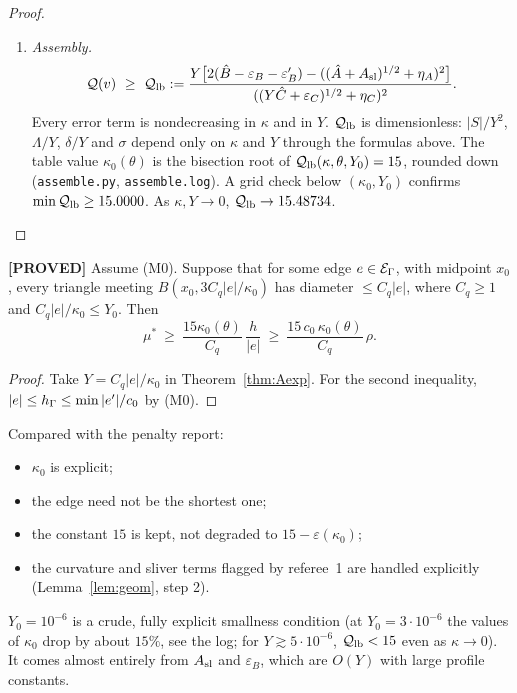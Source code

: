 \documentclass[11pt]{article}
\theoremstyle{remark}\newtheorem{remark}[theorem]{Remark}
\newcommand{\norm}[1]{\|#1\|}\newcommand{\ip}[2]{\langle #1,#2\rangle}\DeclareMathOperator{\curl}{curl}\DeclareMathOperator{\diam}{diam}
\newcommand{\lab}[1]{\textbf{[#1]}}
\begin{document}
\begin{proof}
\begin{enumerate}[label=\arabic*.]
Lemma~\ref{lem:arg}, $|D^2e_F|\le E_2m_6\kappa^4/Y$ and $|\nabla e_F|\le E_1m_6\kappa^5$ on $S$. With $A(z)^{1/2}\le\sqrt2\norm{\nabla z}$:
\[A(v)^{1/2}\le(\hat A+A_{\rm sl})^{1/2}+\eta_A,\quad \eta_A=2E_2m_6\kappa^4\sqrt{|S|}/Y;\qquad
C(v)^{1/2}\le(Y\hat C+\varepsilon_C)^{1/2}+\eta_C,\quad \eta_C=E_1m_6\kappa^5\sqrt\Lambda;\]
\[|B(v)-B_{\Gh}(w)|\le\varepsilon_B':=\frac{E_2m_6\kappa^4\sqrt\Lambda}{Y}\bigl((Y\hat C+\varepsilon_C)^{1/2}+\eta_C\bigr)+\frac{m_2\sqrt\Lambda}{Y}\eta_C,\]
using $B(v)-B(w)=\ip{\dn(v-w)}v+\ip{\dn w}{v-w}$.
\item \emph{Assembly.}
\[\mathcal Q(v)\ \ge\ \mathcal Q_{\rm lb}:=\frac{Y\bigl[2(\hat B-\varepsilon_B-\varepsilon_B')-((\hat A+A_{\rm sl})^{1/2}+\eta_A)^2\bigr]}{((Y\hat C+\varepsilon_C)^{1/2}+\eta_C)^2}.\]
Every error term is nondecreasing in $\kappa$ and in $Y$. $\mathcal Q_{\rm lb}$ is dimensionless: $|S|/Y^2$, $\Lambda/Y$,
$\delta/Y$ and $\sigma$ depend only on $\kappa$ and $Y$ through the formulas above. The table value $\kappa_0(\theta)$ is the
bisection root of $\mathcal Q_{\rm lb}(\kappa,\theta,Y_0)=15$, rounded down (\texttt{assemble.py}, \texttt{assemble.log}). A
grid check below $(\kappa_0,Y_0)$ confirms $\min\mathcal Q_{\rm lb}\ge15.0000$. As $\kappa,Y\to0$, $\mathcal Q_{\rm lb}\to15.48734$.\qedhere
\end{enumerate}
\end{proof}

\begin{corollary}\label{cor:rho}\lab{PROVED}
Assume (M0). Suppose that for some edge $e\in\mathcal E_\Gamma$, with midpoint $x_0$, every triangle meeting $B(x_0,3C_q|e|/\kappa_0)$ has
diameter $\le C_q|e|$, where $C_q\ge1$ and $C_q|e|/\kappa_0\le Y_0$. Then
\[\mu^\ast\ \ge\ \frac{15\kappa_0(\theta)}{C_q}\,\frac h{|e|}\ \ge\ \frac{15\,c_0\,\kappa_0(\theta)}{C_q}\,\rho .\]
\end{corollary}
\begin{proof}
Take $Y=C_q|e|/\kappa_0$ in Theorem~\ref{thm:Aexp}. For the second inequality, $|e|\le h_\Gamma\le\min|e'|/c_0$ by (M0).
\end{proof}
Compared with the penalty report:
\begin{itemize}
\item $\kappa_0$ is explicit;
\item the edge need not be the shortest one;
\item the constant $15$ is kept, not degraded to $15-\varepsilon(\kappa_0)$;
\item the curvature and sliver terms flagged by referee~1 are handled explicitly (Lemma~\ref{lem:geom}, step 2).
\end{itemize}
$Y_0=10^{-6}$ is a crude, fully explicit smallness condition (at $Y_0=3\cdot10^{-6}$ the values of $\kappa_0$ drop by about $15\%$, see the log; for $Y\gtrsim5\cdot10^{-6}$, $\mathcal Q_{\rm lb}<15$ even as $\kappa\to0$). It comes almost entirely from $A_{\rm sl}$ and $\varepsilon_B$, which are $O(Y)$
with large profile constants.
\end{document}
